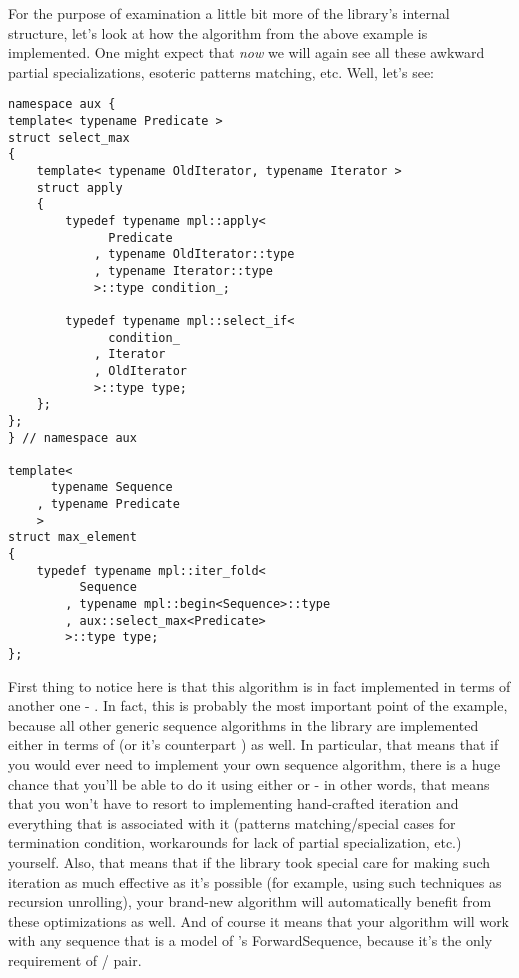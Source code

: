 \documentclass{kapproc}
\begin{document}
For the purpose of examination a little bit more of the 
library's internal structure, let's look at how the 
 algorithm from the above example is 
implemented. One might expect that \emph{now} we will again 
see all these awkward partial specializations, esoteric 
patterns matching, etc. Well, let's see:

{\small
\begin{codesamp}\begin{verbatim}
namespace aux {
template< typename Predicate >
struct select_max
{
    template< typename OldIterator, typename Iterator >
    struct apply
    {
        typedef typename mpl::apply<
              Predicate
            , typename OldIterator::type
            , typename Iterator::type
            >::type condition_;

        typedef typename mpl::select_if<
              condition_
            , Iterator
            , OldIterator
            >::type type;
    };
};
} // namespace aux 

template<
      typename Sequence
    , typename Predicate
    >
struct max_element
{
    typedef typename mpl::iter_fold<    
          Sequence
        , typename mpl::begin<Sequence>::type
        , aux::select_max<Predicate>
        >::type type;
};
\end{verbatim}
\end{codesamp}
}

First thing to notice here is that this algorithm is in fact 
implemented in terms of another one - . 
In fact, this is probably the most important point of the 
example, because all other generic sequence algorithms in 
the library are implemented either in terms of 
(or it's counterpart ) as well. In particular, 
that means that if you would ever need to implement your own 
sequence algorithm, there is a huge chance that you'll be able 
to do it using either  or  - 
in other words, that means that you won't have to resort to 
implementing hand-crafted iteration and everything that is 
associated with it (patterns matching/special cases for 
termination condition, workarounds for lack of partial 
specialization, etc.) yourself. Also, that means that if the 
library took special care for making such iteration as much 
effective as it's possible (for example, using such techniques 
as recursion unrolling), your brand-new algorithm will 
automatically benefit from these optimizations as well. And of 
course it means that your algorithm will work with any 
sequence that is a model of 's 
ForwardSequence, because it's the only requirement of 
/ pair.
\end{document}
